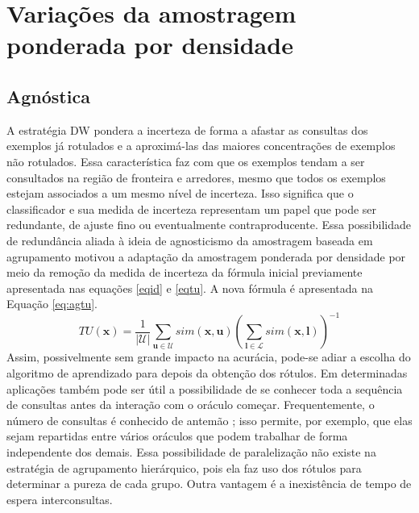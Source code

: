 \section{Variações da amostragem ponderada por densidade}


\subsection{Agnóstica}\label{ag}
A estratégia DW pondera a incerteza de forma a afastar as consultas
dos exemplos já rotulados e a aproximá-las das maiores concentrações de exemplos
não rotulados. Essa característica faz com que os exemplos tendam a ser consultados
na região de fronteira e arredores, mesmo que todos os exemplos
estejam associados a um mesmo nível de incerteza.
Isso significa que o classificador e sua medida de incerteza representam um papel que
pode ser redundante, de ajuste fino ou eventualmente contraproducente.
Essa possibilidade de redundância aliada à ideia de agnosticismo da amostragem baseada
em agrupamento motivou a adaptação da amostragem ponderada por densidade por meio
da remoção da medida de incerteza da fórmula inicial previamente apresentada
nas equações \ref{eqid} e \ref{eqtu}.
A nova fórmula é apresentada na Equação \ref{eq:agtu}.
\begin{equation}\label{eq:agtu}
 TU(\bm{x}) =
 \frac{1}{|\mathcal{U}|} \sum_{\bm{u} \in \mathcal{U}} sim(\bm{x},\bm{u})
 (\sum_{\bm{l} \in \mathcal{L}} sim(\bm{x},\bm{l}))^{-1}
\end{equation}
Assim, possivelmente sem grande impacto na acurácia,
pode-se adiar a escolha do algoritmo de aprendizado para depois da obtenção dos rótulos.
Em determinadas aplicações também pode ser útil a possibilidade de se conhecer toda
a sequência de consultas antes da interação com o oráculo começar.
Frequentemente, o número de consultas é conhecido de antemão \citep{settles2010active};
isso permite, por exemplo, que elas sejam repartidas entre vários oráculos que podem
trabalhar de forma independente dos demais.
Essa possibilidade de paralelização não existe na estratégia de agrupamento hierárquico,
pois ela faz uso dos rótulos para determinar a pureza de cada grupo.
Outra vantagem é a inexistência de tempo de espera interconsultas.

